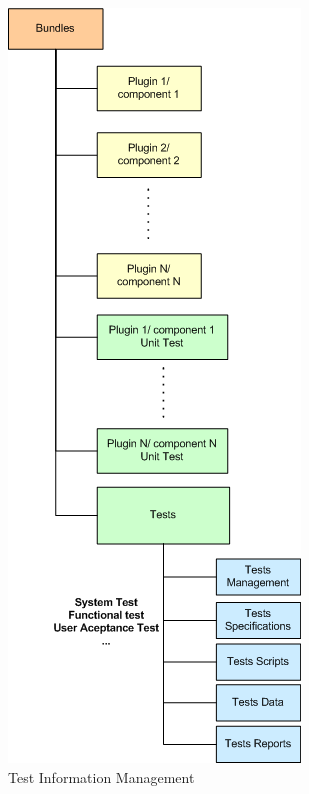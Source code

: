 \begin{figure}[H]
\begin{center}
\includegraphics[scale=0.8]{test_info_management}
\caption{\label{fig:testmanag} Test Information Management} 
\end{center}
\end{figure}

